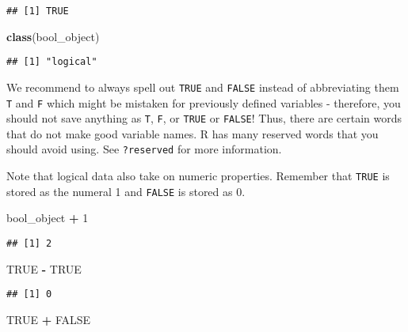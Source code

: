 \documentclass[]{article}
\newenvironment{Shaded}{\begin{snugshade}}{\end{snugshade}}
\newcommand{\KeywordTok}[1]{\textcolor[rgb]{0.13,0.29,0.53}{\textbf{#1}}}
\newcommand{\DecValTok}[1]{\textcolor[rgb]{0.00,0.00,0.81}{#1}}
\newcommand{\StringTok}[1]{\textcolor[rgb]{0.31,0.60,0.02}{#1}}
\newcommand{\OtherTok}[1]{\textcolor[rgb]{0.56,0.35,0.01}{#1}}
\newcommand{\OperatorTok}[1]{\textcolor[rgb]{0.81,0.36,0.00}{\textbf{#1}}}
\newcommand{\NormalTok}[1]{#1}
\begin{document}
\begin{verbatim}
## [1] TRUE
\end{verbatim}

\begin{Shaded}
\begin{Highlighting}[]
\KeywordTok{class}\NormalTok{(bool_object)}
\end{Highlighting}
\end{Shaded}

\begin{verbatim}
## [1] "logical"
\end{verbatim}

We recommend to always spell out \texttt{TRUE} and \texttt{FALSE}
instead of abbreviating them \texttt{T} and \texttt{F} which might be
mistaken for previously defined variables - therefore, you should not
save anything as \texttt{T}, \texttt{F}, or \texttt{TRUE} or
\texttt{FALSE}! Thus, there are certain words that do not make good
variable names. R has many reserved words that you should avoid using.
See \texttt{?reserved} for more information.

Note that logical data also take on numeric properties. Remember that
\texttt{TRUE} is stored as the numeral 1 and \texttt{FALSE} is stored as
0.

\begin{Shaded}
\begin{Highlighting}[]
\NormalTok{bool_object }\OperatorTok{+}\StringTok{ }\DecValTok{1}
\end{Highlighting}
\end{Shaded}

\begin{verbatim}
## [1] 2
\end{verbatim}

\begin{Shaded}
\begin{Highlighting}[]
\OtherTok{TRUE} \OperatorTok{-}\StringTok{ }\OtherTok{TRUE}
\end{Highlighting}
\end{Shaded}

\begin{verbatim}
## [1] 0
\end{verbatim}

\begin{Shaded}
\begin{Highlighting}[]
\OtherTok{TRUE} \OperatorTok{+}\StringTok{ }\OtherTok{FALSE}
\end{Highlighting}
\end{Shaded}
\end{document}
